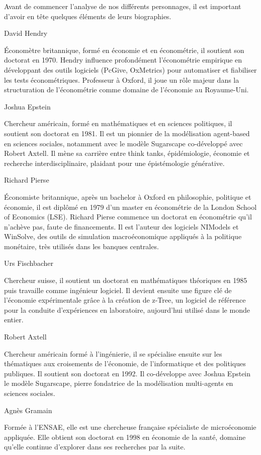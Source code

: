 
Avant de commencer  l'analyse de nos différents personnages, il est important d'avoir en tête quelques éléments de leurs biographies.


David Hendry

Économètre britannique, formé en économie et en économétrie, il soutient son doctorat en 1970. Hendry influence profondément l’économétrie empirique en développant des outils logiciels (PcGive, OxMetrics) pour automatiser et fiabiliser les tests économétriques. Professeur à Oxford, il joue un rôle majeur dans la structuration de l’économétrie comme domaine de l'économie au Royaume-Uni.


Joshua Epstein

Chercheur américain, formé en mathématiques et en sciences politiques, il soutient son doctorat en 1981. Il est un pionnier de la modélisation agent-based en sciences sociales, notamment avec le modèle Sugarscape co-développé avec Robert Axtell. Il mène sa carrière entre think tanks, épidémiologie, économie et recherche interdisciplinaire, plaidant pour une épistémologie générative.


Richard Pierse

Économiste britannique, après un bachelor à Oxford en philosophie, politique et économie, il est diplômé en 1979 d'un master en économétrie de la London School of Economics (LSE). Richard Pierse commence un doctorat en économétrie qu'il n'achève pas, faute de financements. Il est l’auteur des logiciels NIModels et WinSolve, des outils de simulation macroéconomique appliqués à la politique monétaire, très utilisés dans les banques centrales.


Urs Fischbacher

Chercheur suisse, il soutient un doctorat en mathématiques théoriques en 1985 puis travaille comme ingénieur logiciel. Il devient ensuite une figure clé de l’économie expérimentale grâce à la création de z-Tree, un logiciel de référence pour la conduite d’expériences en laboratoire, aujourd’hui utilisé dans le monde entier.


Robert Axtell

Chercheur américain formé à l’ingénierie, il se spécialise ensuite sur les thématiques aux croisements de l’économie, de l’informatique et des politiques publiques. Il soutient son doctorat en 1992. Il co-développe avec Joshua Epstein le modèle Sugarscape, pierre fondatrice de la modélisation multi-agents en sciences sociales.


Agnès Gramain

Formée à l’ENSAE, elle est une chercheuse française spécialiste de microéconomie appliquée. Elle obtient son doctorat en 1998 en économie de la santé, domaine qu'elle continue d'explorer dans ses recherches par la suite.


